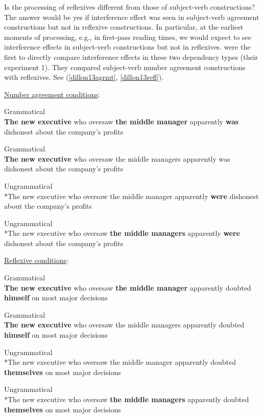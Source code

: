 \documentclass{cambridge7A}\usepackage[]{graphicx}\usepackage[]{color}
\begin{document}
Is the processing of  reflexives different from those of subject-verb constructions? The answer would be yes if interference effect was seen in subject-verb agreement constructions but not in reflexive constructions. In particular, at the earliest moments of processing, e.g., in first-pass reading times, we would expect to see interference effects in  subject-verb constructions but not in reflexives. \cite{DillonMishlerSloggett2013} were the first to directly compare interference effects in these two dependency types  (their experiment 1).  They compared subject-verb number agreement constructions with reflexives. See (\ref{dillon13agrmt}, \ref{dillon13refl}).

\underline{Number agreement conditions}: 

\begin{exe}
\ex \label{dillon13agrmt}
\begin{xlist}
\item Grammatical \\
\textbf{The new executive} who oversaw \textbf{the middle manager} apparently \textbf{was} dishonest about the company's profits
\item Grammatical \\
\textbf{The new executive} who oversaw the middle managers apparently was dishonest about the company's profits
\item Ungrammatical \\
*The new executive who oversaw the middle manager apparently \textbf{were} dishonest about the company's profits
\item  Ungrammatical \\
*The new executive who oversaw \textbf{the middle managers} apparently \textbf{were} dishonest about the company's profits
\end{xlist}
\end{exe}

\underline{Reflexive conditions}: 

\begin{exe}
\ex \label{dillon13refl}
\begin{xlist}
\item 
Grammatical \\
\textbf{The new executive} who oversaw \textbf{the middle manager} apparently doubted \textbf{himself} on most major decisions
\item
Grammatical\\ 
\textbf{The new executive} who oversaw the middle managers apparently doubted \textbf{himself} on most major decisions
\item
Ungrammatical \\
*The new executive who oversaw the middle manager apparently doubted \textbf{themselves} on most major decisions
\item 
Ungrammatical \\
*The new executive who oversaw \textbf{the middle managers} apparently doubted \textbf{themselves} on most major decisions
\end{xlist}
\end{exe}
\end{document}
